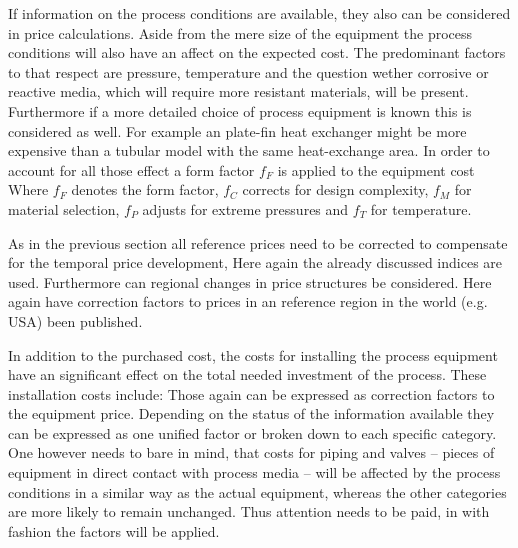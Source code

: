 If information on the process conditions are available, they also can be considered in price calculations.
Aside from the mere size of the equipment the process conditions will also have an affect on the expected
cost. The predominant factors to that respect are pressure, temperature and the question wether corrosive
or reactive media, which will require more resistant materials, will be present. Furthermore if a more
detailed choice of process equipment is known this is considered as well. For example an plate-fin heat
exchanger might be more expensive than a tubular model with the same heat-exchange area.
In order to account for all those effect a form factor $f_F$ is applied to the equipment cost
%
Where $f_F$ denotes the form factor, $f_C$ corrects for design complexity, $f_M$ for material selection,
$f_P$ adjusts for extreme pressures and $f_T$ for temperature.

As in the previous section all reference prices need to be corrected to compensate for the temporal price
development, Here again the already discussed indices are used. Furthermore can regional changes
in price structures be considered. Here again have correction factors to prices in an reference region in
the world (e.g. USA) been published.

In addition to the purchased cost, the costs for installing the process equipment have an significant effect
on the total needed investment of the process. These installation costs include:
%
Those again can be expressed as correction factors to the equipment price. Depending on the status
of the information available they can be expressed as one unified factor or broken down to each specific
category. One however needs to bare in mind, that costs for piping and valves -- pieces of equipment
in direct contact with process media -- will be affected by the process conditions in a similar
way as the actual equipment, whereas the other categories are more likely to remain unchanged. Thus
attention needs to be paid, in with fashion the factors will be applied.

